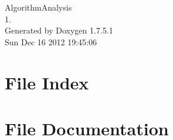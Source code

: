 \documentclass[a4paper]{book}
\begin{document}
\begin{titlepage}
\vspace*{7cm}
\begin{center}
{\Large \-Algorithm\-Analysis \\[1ex]\large 1. }\\
\vspace*{1cm}
{\large \-Generated by Doxygen 1.7.5.1}\\
\vspace*{0.5cm}
{\small Sun Dec 16 2012 19:45:06}\\
\end{center}
\end{titlepage}
\clearemptydoublepage
{}
\tableofcontents
\clearemptydoublepage
{}
\chapter{\-File \-Index}

\chapter{\-File \-Documentation}











\printindex
\end{document}
